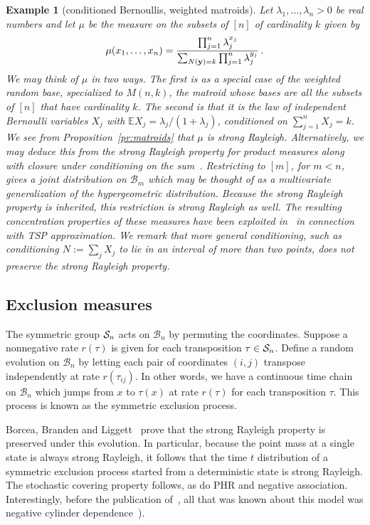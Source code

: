 \documentclass[10pt]{article}
\theoremstyle{plain}
\newtheorem{example}[thm]{Example}
\theoremstyle{remark}
\def\E{{\mathbb E}}
\def\B{{\mathcal B}}
\def\yy{{\bf y}}
\begin{document}
\begin{example}[conditioned Bernoullis, weighted matroids]
\label{eg:cond bern}
Let $\lambda_1 , \ldots , \lambda_n > 0$ be real numbers and let
$\mu$ be the measure on the subsets of $[n]$ of cardinality $k$
given by
$$\mu (x_1 , \ldots , x_n) = \frac{\prod_{j=1}^n \lambda_j^{x_j}}
   {\sum_{N (\yy) = k} \prod_{j=1}^n \lambda_j^{y_j}} \, .$$
We may think of $\mu$ in two ways.  The first is as a special
case of the weighted random base, specialized to $M(n,k)$,
the matroid whose bases are all the subsets of $[n]$
that have cardinality $k$.  The second is that it is the law of
independent Bernoulli variables $X_j$ with $\E X_j =
\lambda_j / (1 + \lambda_j)$, conditioned on $\sum_{j=1}^n X_j = k$.
We see from Proposition~\ref{pr:matroids} that $\mu$ is strong
Rayleigh.  Alternatively, we may deduce this from the strong
Rayleigh property for product measures along with closure under
conditioning on the sum~\cite[Corollary~4.18]{borcea-branden-liggett}.
Restricting to $[m]$, for $m < n$, gives a joint distribution
on $\B_m$ which may be thought of as a multivariate generalization
of the hypergeometric distribution.  Because the strong Rayleigh
property is inherited, this restriction is strong Rayleigh as well.
The resulting concentration properties of these measures
have been exploited in~\cite{saberi} in connection with
TSP approximation.  We remark that more general conditioning,
such as conditioning $N := \sum_j X_j$ to lie in an interval
of more than two points, does not preserve the strong Rayleigh
property.
\end{example}


\subsection{Exclusion measures} \label{ss:exclusion}

The symmetric group ${\cal S}_n$ acts on $\B_n$ by permuting
the coordinates.  Suppose a nonnegative rate $r(\tau)$
is given for each transposition $\tau \in {\cal S}_n$.
Define a random evolution on $\B_n$ by letting each
pair of coordinates $(i,j)$ transpose independently
at rate $r(\tau_{ij})$.  In other words, we have a
continuous time chain on $\B_n$ which jumps from $x$ to
$\tau (x)$ at rate $r(\tau)$ for each transposition $\tau$.
This process is known as the symmetric exclusion process.

Borcea, Branden and Liggett~\cite[Proposition~5.1]{borcea-branden-liggett}
prove that the strong Rayleigh property is preserved under this
evolution.  In particular, because the point mass at a single
state is always strong Rayleigh, it follows that the time $t$
distribution of a symmetric exclusion process started from a
deterministic state is strong Rayleigh.  The stochastic covering
property follows, as do PHR and negative association.  Interestingly,
before the publication of~\cite{borcea-branden-liggett}, all
that was known about this model was negative cylinder
dependence~\cite[Lemma~2.3.4]{liggett77}).
\end{document}
